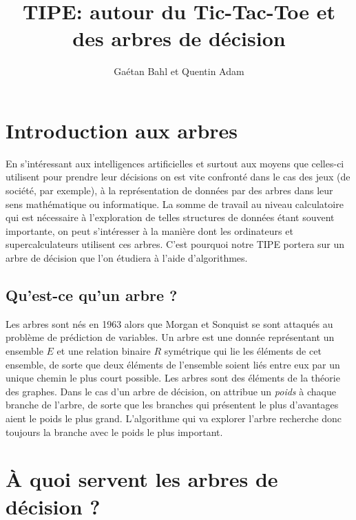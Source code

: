 \documentclass{article}
\title{TIPE: autour du Tic-Tac-Toe et des arbres de décision}
\author{Gaétan Bahl et Quentin Adam}
\begin{document}
\maketitle
\tableofcontents
\listoffigures
{}
\clearpage

\newcommand{\fonction}[5]{\begin{array}{l|rcl}
#1: & #2 & \longrightarrow & #3 \\
    & #4 & \longmapsto & #5 \end{array}}

\section{Introduction aux arbres}


En s'intéressant aux intelligences artificielles et surtout aux moyens que
celles-ci utilisent pour prendre leur décisions
on est vite confronté dans le cas des jeux (de société, par exemple), à la
représentation de données par des arbres dans leur sens mathématique ou
informatique. La somme de travail au niveau calculatoire qui est nécessaire à l'exploration de telles structures de données étant souvent importante,
on peut s'intéresser à la manière dont les ordinateurs et supercalculateurs utilisent ces arbres.
C'est pourquoi notre TIPE portera sur un arbre de décision que l'on étudiera à l'aide d'algorithmes.


\subsection{Qu'est-ce qu'un arbre ?}

Les arbres sont nés en 1963 alors que Morgan et Sonquist se sont attaqués au problème de prédiction de variables. 
Un arbre est une donnée représentant un ensemble $E$ et une relation binaire $R$
symétrique qui lie les éléments de cet ensemble,
de sorte que deux éléments de l'ensemble soient liés entre eux par un unique
chemin le plus court possible. Les arbres sont des éléments de la théorie des graphes.
Dans le cas d'un arbre de décision, on attribue un \emph{poids} à chaque branche de l'arbre, de sorte que
les branches qui présentent le plus d'avantages aient le poids le plus grand.
L'algorithme qui va explorer l'arbre recherche donc toujours la branche avec le poids le plus important.


\section{\uppercase{à} quoi servent les arbres de décision ?}
\end{document}
